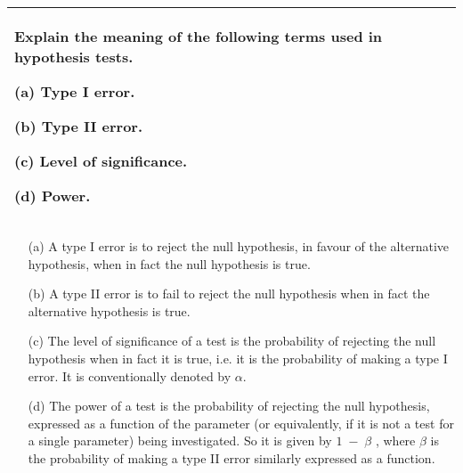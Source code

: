 \documentclass[a4paper,12pt]{article}
\begin{document}


\begin{table}[ht!]
 
\centering
 
\begin{tabular}{|p{15cm}|}
 
\hline  

\large
\noindent Explain the meaning of the following terms used in hypothesis tests. 
 
 (a) Type I error. 

 
 (b) Type II error. 

 
 (c) Level of significance. 

 
 (d) Power. 

 

\\ \hline
  
\end{tabular}

\end{table} 

\large

\begin{itemize}
    \item[(a)] A type I error is to reject the null hypothesis, in favour of the alternative hypothesis, when in fact the null hypothesis is true. 
 
    \item[(b)] A type II error is to fail to reject the null hypothesis when in fact the alternative hypothesis is true. 
 
    \item[(c)] The level of significance of a test is the probability of rejecting the null hypothesis when in fact it is true, i.e. it is the probability of making a type I error.  It is conventionally denoted by $\alpha$. 
 
    \item[(d)] The power of a test is the probability of rejecting the null hypothesis, expressed as a function of the parameter (or equivalently, if it is not a test for a single parameter) being investigated.  So it is given by $1 \;-\; \beta$  , where $\beta$  is the probability of making a type II error similarly expressed as a function. 
 
\end{itemize} 
\end{document}
